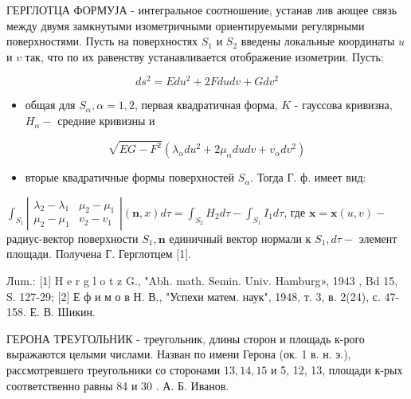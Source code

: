 \documentclass[10pt]{article}
\begin{document}
ГЕРГЛОТЦА ФОРМУЈА - интегральное соотношение, устанав лив ающее связь между двумя замкнутыми изометричными ориентируемыми регулярными поверхностями. Пусть на поверхностях $S_{1}$ и $S_{2}$ введены локальные координаты $u$ и $v$ так, что по их равенству устанавливается отображение изометрии. Пусть:



\[

d s^{2}=E d u^{2}+2 F d u d v+G d v^{2}

\]



\begin{itemize}

  \item общая для $S_{\alpha}, \alpha=1,2$, первая квадратичная форма, $K$ - гауссова кривизна, $H_{\alpha}-$ средние кривизны и

\end{itemize}



\[

\sqrt{E G-F^{2}}\left(\lambda_{\alpha} d u^{2}+2 \mu_{\alpha} d u d v+v_{\alpha} d v^{2}\right)

\]



\begin{itemize}

  \item вторые квадратичные формы поверхностей $S_{\alpha}$. Тогда Г. ф. имеет вид:

\end{itemize}



$\int_{S_{1}}\left|\begin{array}{ll}\lambda_{2}-\lambda_{1} & \mu_{2}-\mu_{1} \\ \mu_{2}-\mu_{1} & v_{2}-v_{1}\end{array}\right|(\boldsymbol{n}, x) d \tau=\int_{S_{2}} H_{2} d \tau-\int_{S_{1}} I_{1} d \tau$, где $\boldsymbol{x}=\boldsymbol{x}(u, v)-$ радиус-вектор поверхности $S_{1}, \boldsymbol{n}$ единичный вектор нормали к $S_{1}, d \tau-$ элемент площади. Получена Г. Герглотцем [1].



Лum.: [1] H e r g l o t z G., "Abh. math. Semin. Univ. Hamburg», 1943 , Bd 15, S. 127-29; [2] Е ф и м о в Н. В., "Успехи матем. наук", 1948, т. 3, в. 2(24), с. 47-158. Е. В. Шикин.



ГЕРОНА ТРЕУГОЛЬНИК - треугольник, длины сторон и площадь к-рого выражаются целыми числами. Назван по имени Герона (ок. 1 в. н. э.), рассмотревшего треугольники со сторонами $13,14,15$ и 5, 12, 13, площади к-рых соответственно равны 84 и 30 . А. Б. Иванов.
\end{document}

